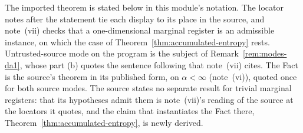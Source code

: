 
The imported theorem is stated below in this module's notation. The locator
notes after the statement tie each display to its place in the source, and
note~(vii) checks that a one-dimensional marginal register is an admissible
instance, on which the  case of
Theorem~\ref{thm:accumulated-entropy} rests. Untrusted-source mode on the
program is the subject of Remark~\ref{rem:modes-da1}, whose part (b) quotes
the sentence following \cite[Eq.~(1)]{arqand2025meat} that note~(vii)
cites. The Fact is the source's theorem in its published form, on
$\alpha<\infty$ (note~(vi)), quoted once for both source modes. The source states no separate result for trivial
marginal registers: that its hypotheses admit them is note~(vii)'s reading
of the source at the locators it quotes, and the claim that instantiates the
Fact there, Theorem~\ref{thm:accumulated-entropy}, is newly derived.

